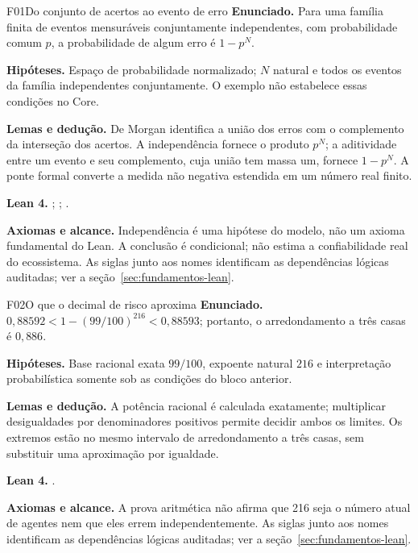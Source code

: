 \begin{formalizacao}{F01}{Do conjunto de acertos ao evento de erro}
\textbf{Enunciado.} Para uma família finita de eventos mensuráveis conjuntamente independentes, com probabilidade comum $p$, a probabilidade de algum erro é $1-p^N$.

\textbf{Hipóteses.} Espaço de probabilidade normalizado; $N$ natural e todos os eventos da família independentes conjuntamente. O exemplo não estabelece essas condições no Core.

\textbf{Lemas e dedução.} De Morgan identifica a união dos erros com o complemento da interseção dos acertos. A independência fornece o produto $p^N$; a aditividade entre um evento e seu complemento, cuja união tem massa um, fornece $1-p^N$. A ponte formal converte a medida não negativa estendida em um número real finito.

\textbf{Lean 4.} ; ; .

\textbf{Axiomas e alcance.} Independência é uma hipótese do modelo, não um axioma fundamental do Lean. A conclusão é condicional; não estima a confiabilidade real do ecossistema. As siglas junto aos nomes identificam as dependências lógicas auditadas; ver a seção~\ref{sec:fundamentos-lean}.
\end{formalizacao}

\begin{formalizacao}{F02}{O que o decimal de risco aproxima}
\textbf{Enunciado.} $0{,}88592<1-(99/100)^{216}<0{,}88593$; portanto, o arredondamento a três casas é $0{,}886$.

\textbf{Hipóteses.} Base racional exata $99/100$, expoente natural $216$ e interpretação probabilística somente sob as condições do bloco anterior.

\textbf{Lemas e dedução.} A potência racional é calculada exatamente; multiplicar desigualdades por denominadores positivos permite decidir ambos os limites. Os extremos estão no mesmo intervalo de arredondamento a três casas, sem substituir uma aproximação por igualdade.

\textbf{Lean 4.} .

\textbf{Axiomas e alcance.} A prova aritmética não afirma que 216 seja o número atual de agentes nem que eles errem independentemente. As siglas junto aos nomes identificam as dependências lógicas auditadas; ver a seção~\ref{sec:fundamentos-lean}.
\end{formalizacao}

